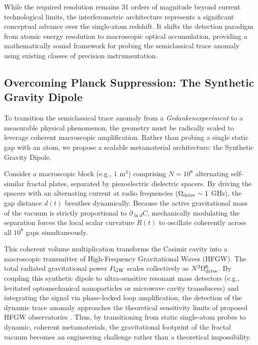 \documentclass[12pt,letterpaper]{article}
\begin{document}
While the required resolution remains 31 orders of magnitude beyond current technological limits, the interferometric architecture represents a significant conceptual advance over the single-atom redshift. It shifts the detection paradigm from atomic energy resolution to macroscopic optical accumulation, providing a mathematically sound framework for probing the semiclassical trace anomaly using existing classes of precision instrumentation.

\subsection{Overcoming Planck Suppression: The Synthetic Gravity Dipole}

To transition the semiclassical trace anomaly from a \emph{Gedankenexperiment} to a measurable physical phenomenon, the geometry must be radically scaled to leverage coherent macroscopic amplification. Rather than probing a single static gap with an atom, we propose a scalable metamaterial architecture: the Synthetic Gravity Dipole.

Consider a macroscopic block (e.g., $1 \text{ m}^3$) comprising $N = 10^8$ alternating self-similar fractal plates, separated by piezoelectric dielectric spacers. By driving the spacers with an alternating current at radio frequencies ($\Omega_{\rm drive} \sim 1$ GHz), the gap distance $d(t)$ breathes dynamically. Because the active gravitational mass of the vacuum is strictly proportional to $\partial_{\ln d}C$, mechanically modulating the separation forces the local scalar curvature $R(t)$ to oscillate coherently across all $10^8$ gaps simultaneously. 

This coherent volume multiplication transforms the Casimir cavity into a macroscopic transmitter of High-Frequency Gravitational Waves (HFGW). The total radiated gravitational power $P_{\rm GW}$ scales collectively as $N^2 \Omega_{\rm drive}^6$. By coupling this synthetic dipole to ultra-sensitive resonant mass detectors (e.g., levitated optomechanical nanoparticles or microwave cavity transducers) and integrating the signal via phase-locked loop amplification, the detection of the dynamic trace anomaly approaches the theoretical sensitivity limits of proposed HFGW observatories \cite{aggarwal2020}. Thus, by transitioning from static single-atom probes to dynamic, coherent metamaterials, the gravitational footprint of the fractal vacuum becomes an engineering challenge rather than a theoretical impossibility.
\end{document}
